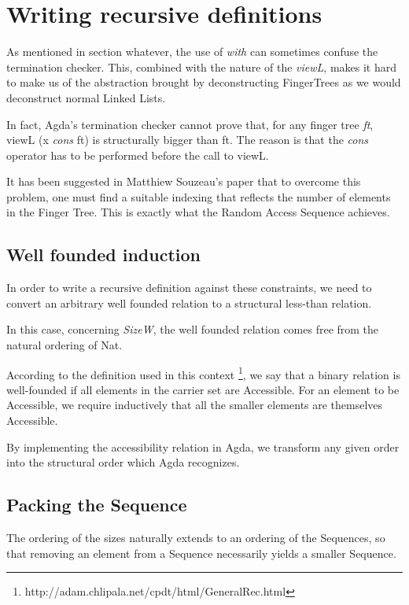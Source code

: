 \documentclass[12pt,twoside,notitlepage]{report}
\begin{document}
\section{Writing recursive definitions}

As mentioned in section whatever, the use of \textit{with} can sometimes confuse the termination checker. This, combined with the nature of the \textit{viewL}, makes it hard to make us of the abstraction brought by deconstructing FingerTrees as we would deconstruct normal Linked Lists.

In fact, Agda's termination checker cannot prove that, for any finger tree \textit{ft}, viewL (x \textit{cons} ft) is structurally bigger than ft. The reason is that the \textit{cons} operator has to be performed before the call to viewL.
 
It has been suggested in Matthiew Souzeau's paper \cite{coq} that to overcome this problem, one must find a suitable indexing that reflects the number of elements in the Finger Tree. This is exactly what the Random Access Sequence achieves.

\subsection{Well founded induction}

In order to write a recursive definition against these constraints, we need to convert an arbitrary well founded relation to a structural less-than relation. 

In this case, concerning \textit{SizeW}, the well founded relation comes free from the natural ordering of Nat. 

According to the definition used in this context \footnote{http://adam.chlipala.net/cpdt/html/GeneralRec.html}, we say that a binary relation is well-founded if all elements in the carrier set are Accessible. For an element to be Accessible, we require inductively that all the smaller elements are themselves Accessible.

By implementing the accessibility relation in Agda, we transform any given order into the structural order which Agda recognizes.

\subsection{Packing the Sequence}

The ordering of the sizes naturally extends to an ordering of the Sequences, so that removing an element from a Sequence necessarily yields a smaller Sequence.
\end{document}
